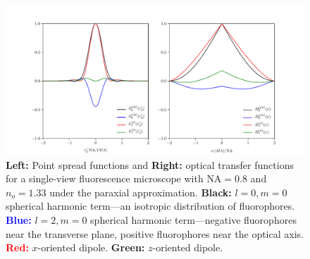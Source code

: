 \documentclass[11pt]{article}
\begin{document}
\begin{figure}[h]
 \captionsetup{width=1.0\linewidth}
 \centering
   \centering
   \includegraphics[width = 1.\textwidth]{../calculations/compare-ft/psfs.pdf}
   \caption{\textbf{Left:} Point spread functions and \textbf{Right:} optical
     transfer functions for a single-view fluorescence microscope with
     $\text{NA}=0.8$ and $n_o=1.33$ under the paraxial approximation.
     \textbf{Black:} $l=0, m=0$ spherical harmonic term---an isotropic
     distribution of fluorophores. \textcolor{blue}{\textbf{Blue:}} $l=2, m=0$
     spherical harmonic term---negative fluorophores near the transverse plane,
     positive fluorophores near the optical axis. \textcolor{red}{\textbf{Red:}}
     $x$-oriented dipole. \textcolor{OliveGreen}{\textbf{Green:}} $z$-oriented
     dipole.}
   \label{fig:para}
\end{figure}
    
{}


\appendix
\end{document}
